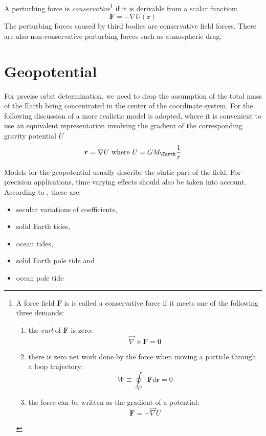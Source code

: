 A perturbing force is \emph{conservative}\footnote{
A force field $\bm{F}$ is is called a conservative force if it meets one of the 
following three demands:
  \begin{enumerate}
    \item the \emph{curl} of $\bm{F}$ is zero:\begin{equation}\vec{\nabla} \times \bm{F} = \bm{0}\end{equation}
    \item there is zero net work done by the force when moving a particle 
      through a loop trajectory:\begin{equation}W \equiv \oint _C \bm{F}d\bm{r}=0 \end{equation}
    \item the force can be written as the gradient of a potential:\begin{equation}\bm{F}=-\vec{\nabla} U\end{equation}
  \end{enumerate}
  } if it is derivable from a scalar 
function:
\begin{equation}
  \bm{F} = -\nabla U(\bm{r})
\end{equation}
The perturbing forces caused by third bodies are conservative field forces. 
There are also non-conservative perturbing forces such as atmospheric drag.

\section{Geopotential}
For precise orbit determination, we need to drop the assumption of the total mass 
of the Earth being concentrated in the center of the coordinate system. For the
following discussion of a more realistic model is adopted, where it is convenient 
to use an equivalent representation involving the gradient of the corresponding 
gravity potential \(U\)
\begin{equation}
    \label{eq:geopotential}
    \ddot{\bm{r}} = \nabla U \textrm{ where } U = G M_{\Earth} \frac{1}{r}
\end{equation}

Models for the geopotential usually describe the static part of the field. For 
precision applications, time varying effects should also be taken into account. 
According to \cite{iers2010}, these are:
\begin{itemize}
  \item secular variations of coefficients,
  \item solid Earth tides,
  \item ocean tides,
  \item solid Earth pole tide and
  \item ocean pole tide
\end{itemize}

